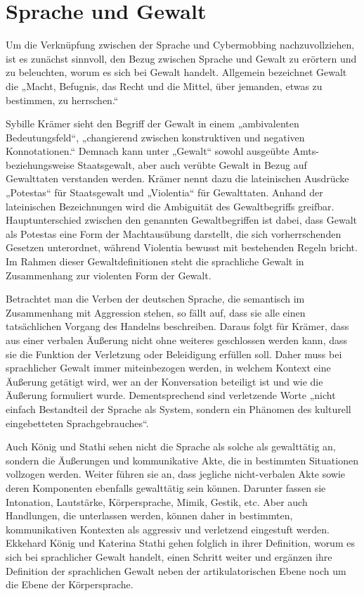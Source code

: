 \section{Sprache und Gewalt}
Um die Verknüpfung zwischen der Sprache und Cybermobbing nachzuvollziehen, ist es zunächst sinnvoll, den Bezug zwischen Sprache und Gewalt zu erörtern und zu beleuchten, worum es sich bei Gewalt handelt.
Allgemein bezeichnet Gewalt die „Macht, Befugnis, das Recht und die Mittel, über jemanden, etwas zu bestimmen, zu herrschen.“ \cite{DG13}

Sybille Krämer sieht den Begriff der Gewalt in einem „ambivalenten Bedeutungsfeld“, „changierend zwischen konstruktiven und negativen Konnotationen.“ \cite[S.\,35]{SKR07}
Demnach kann unter „Gewalt“ sowohl ausgeübte Amts- beziehungsweise Staatsgewalt, aber auch verübte Gewalt in Bezug auf Gewalttaten verstanden werden.
Krämer nennt dazu die lateinischen Ausdrücke „Potestas“ für Staatsgewalt und „Violentia“ für Gewalttaten.
Anhand der lateinischen Bezeichnungen wird die Ambiguität des Gewaltbegriffs greifbar.
Hauptunterschied zwischen den genannten Gewaltbegriffen ist dabei, dass Gewalt als Potestas eine Form der Machtausübung darstellt, die sich vorherrschenden Gesetzen unterordnet, während Violentia bewusst mit bestehenden Regeln bricht.
Im Rahmen dieser Gewaltdefinitionen steht die sprachliche Gewalt in Zusammenhang zur violenten Form der Gewalt.

Betrachtet man die Verben der deutschen Sprache, die semantisch im Zusammenhang mit Aggression stehen, so fällt auf, dass sie alle einen tatsächlichen Vorgang des Handelns beschreiben.
Daraus folgt für Krämer, dass aus einer verbalen Äußerung nicht ohne weiteres geschlossen werden kann, dass sie die Funktion der Verletzung oder Beleidigung erfüllen soll.
Daher muss bei sprachlicher Gewalt immer miteinbezogen werden, in welchem Kontext eine Äußerung getätigt wird, wer an der Konversation beteiligt ist und wie die Äußerung formuliert wurde.
Dementsprechend sind verletzende Worte „nicht einfach Bestandteil der Sprache als System, sondern ein Phänomen des kulturell eingebetteten Sprachgebrauches“. \cite[S.\,35]{SKR07}

Auch König und Stathi sehen nicht die Sprache als solche als gewalttätig an, sondern die Äußerungen und kommunikative Akte, die in bestimmten Situationen vollzogen werden. \cite[S.\,47]{EK07}
Weiter führen sie an, dass jegliche nicht-verbalen Akte sowie deren Komponenten ebenfalls gewalttätig sein können.
Darunter fassen sie Intonation, Lautstärke, Körpersprache, Mimik, Gestik, etc. Aber auch Handlungen, die unterlassen werden, können daher in bestimmten, kommunikativen Kontexten als aggressiv und verletzend eingestuft werden.
Ekkehard König und Katerina Stathi gehen folglich in ihrer Definition, worum es sich bei sprachlicher Gewalt handelt, einen Schritt weiter und ergänzen ihre Definition der sprachlichen Gewalt neben der artikulatorischen Ebene noch um die Ebene der Körpersprache.

